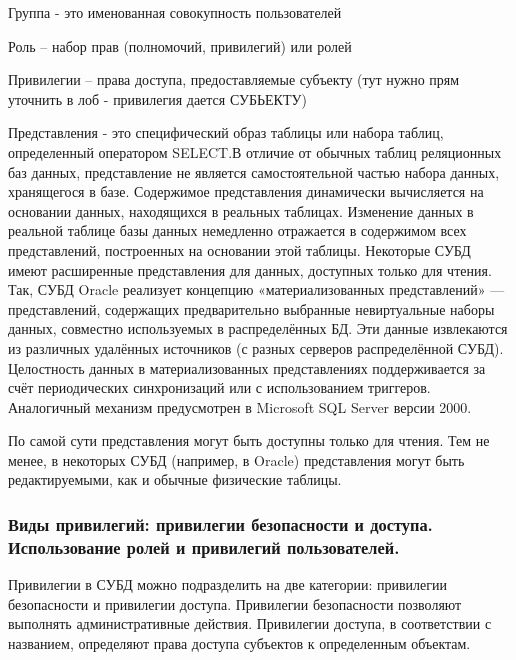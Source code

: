 Группа - это именованная совокупность пользователей

Роль – набор прав (полномочий, привилегий) или ролей

Привилегии – права доступа, предоставляемые субъекту (тут нужно прям уточнить в лоб - привилегия дается СУБЬЕКТУ)

Представления - это специфический образ таблицы или набора таблиц,
определенный оператором SELECT.В отличие от обычных таблиц реляционных баз данных, представление не является самостоятельной частью набора данных, хранящегося в базе. Содержимое представления динамически вычисляется на основании данных, находящихся в реальных таблицах. Изменение данных в реальной таблице базы данных немедленно отражается в содержимом всех представлений, построенных на основании этой таблицы. Некоторые СУБД имеют расширенные представления для данных, доступных только для чтения. Так, СУБД Oracle реализует концепцию «материализованных представлений» — представлений, содержащих предварительно выбранные невиртуальные наборы данных, совместно используемых в распределённых БД. Эти данные извлекаются из различных удалённых источников (с разных серверов распределённой СУБД). Целостность данных в материализованных представлениях поддерживается за счёт периодических синхронизаций или с использованием триггеров. Аналогичный механизм предусмотрен в Microsoft SQL Server версии 2000.

По самой сути представления могут быть доступны только для чтения. Тем не менее, в некоторых СУБД (например, в Oracle) представления могут быть редактируемыми, как и обычные физические таблицы.

\subsubsection{Виды привилегий: привилегии безопасности и доступа. Использование ролей и привилегий пользователей.}
Привилегии в СУБД можно подразделить на две категории: привилегии
безопасности и привилегии доступа. Привилегии безопасности позволяют
выполнять административные действия. Привилегии доступа, в соответствии с
названием, определяют права доступа субъектов к определенным объектам.

